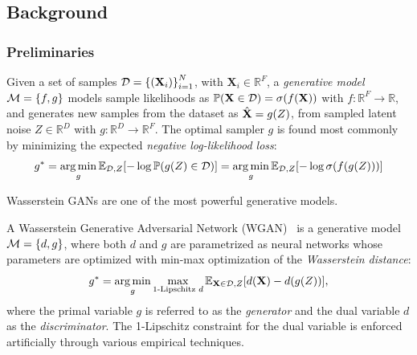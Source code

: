 \subsection{Background}
\label{sec:background_gggcrp}

\subsubsection{Preliminaries}

\begin{definition}
    Given a set of samples $\mathcal{D}=\mathopen{}\left\{\mathopen{}\left(\mathbf{X}_i\right)\right\}_{i=1}^{N}$, with $\mathbf{X}_i \in \mathbb{R}^F$, a \emph{generative model} $\mathcal{M}=\mathopen{}\left\{f,g\right\}$ models sample likelihoods as $\mathbb{P}\mathopen{}\left(\mathbf{X} \in \mathcal{D}\right)=\sigma\mathopen{}\left(f\mathopen{}\left(\mathbf{X}\right)\right)$ with $f: \mathbb{R}^F \to \mathbb{R}$, and generates new samples from the dataset as $\hat{\mathbf{X}}=g\mathopen{}\left(Z\right)$, from sampled latent noise $Z\in\mathbb{R}^D$ with $g:\mathbb{R}^D \to \mathbb{R}^F$. The optimal sampler $g$ is found most commonly by minimizing the expected \emph{negative log-likelihood loss}:
    \begin{equation}
        g^*=\operatorname*{arg\,min}_{g}{\mathbb{E}_{\mathcal{D},Z}\mathopen{}\left[-\log{\mathbb{P}\mathopen{}\left(g\mathopen{}\left(Z\right) \in \mathcal{D}\right)}\right]}=\operatorname*{arg\,min}_{g}{\mathbb{E}_{\mathcal{D},Z}\mathopen{}\left[-\log{\sigma\mathopen{}\left(f\mathopen{}\left(g\mathopen{}\left(Z\right)\right)\right)}\right]}
    \end{equation}
\end{definition}

Wasserstein GANs are one of the most powerful generative models.

\begin{definition}
   A Wasserstein Generative Adversarial Network (WGAN)~\cite{arjovsky_wasserstein_2017} is a generative model $\mathcal{M}=\mathopen{}\left\{d,g\right\}$, where both $d$ and $g$ are parametrized as neural networks whose parameters are optimized with min-max optimization of the \emph{Wasserstein distance}:
   \begin{equation}
   g^*=\operatorname*{arg\,min}_{g}\max_{\text{1-Lipschitz } d}{\mathbb{E}_{\mathbf{X}\in\mathcal{D},Z}\mathopen{}\left[d\mathopen{}\left(\mathbf{X}\right)-d\mathopen{}\left(g\mathopen{}\left(Z\right)\right)\right]},
    \end{equation}
   where the primal variable $g$ is referred to as the \emph{generator} and the dual variable $d$ as the \emph{discriminator}. The 1-Lipschitz constraint for the dual variable is enforced artificially through various empirical techniques.
\end{definition}

